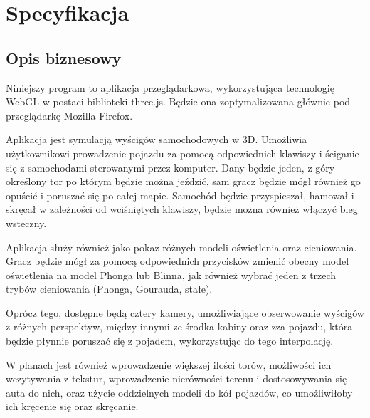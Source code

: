 \documentclass[11pt]{article}
\let\Oldsection\section
\renewcommand{\section}{\FloatBarrier\Oldsection}
\let\Oldsubsection\subsection
\renewcommand{\subsection}{\FloatBarrier\Oldsubsection}
\begin{document}
\begin{table}[!h]
\centering
\def\arraystretch{2}%
\caption{Lista zmian}

\end{table}


\newpage


\section{Specyfikacja}
\subsection{Opis biznesowy}

\par Niniejszy program to aplikacja przeglądarkowa, wykorzystująca technologię WebGL w postaci biblioteki three.js. Będzie ona zoptymalizowana głównie pod przeglądarkę Mozilla Firefox. 
\par Aplikacja jest symulacją wyścigów samochodowych w 3D. Umożliwia użytkownikowi prowadzenie pojazdu za pomocą odpowiednich klawiszy i ściganie się z samochodami sterowanymi przez komputer. Dany będzie jeden, z góry określony tor po którym będzie można jeździć, sam gracz będzie mógł również go opuścić i poruszać się po całej mapie. Samochód będzie przyspieszał, hamował i skręcał w zależności od wciśniętych klawiszy, będzie można również włączyć bieg wsteczny. 
\par Aplikacja służy również jako pokaz różnych modeli oświetlenia oraz cieniowania. Gracz będzie mógł za pomocą odpowiednich przycisków zmienić obecny model oświetlenia na model Phonga lub Blinna, jak również wybrać jeden z trzech trybów cieniowania (Phonga, Gourauda, stałe). 
\par Oprócz tego, dostępne będą cztery kamery, umożliwiające obserwowanie wyścigów z różnych perspektyw, między innymi ze środka kabiny oraz zza pojazdu, która będzie płynnie poruszać się z pojadem, wykorzystując do tego interpolację.
\par W planach jest również wprowadzenie większej ilości torów, możliwości ich wczytywania z tekstur, wprowadzenie nierówności terenu i dostosowywania się auta do nich, oraz użycie oddzielnych modeli do kół pojazdów, co umożliwiłoby ich kręcenie się oraz skręcanie.
\end{document}
